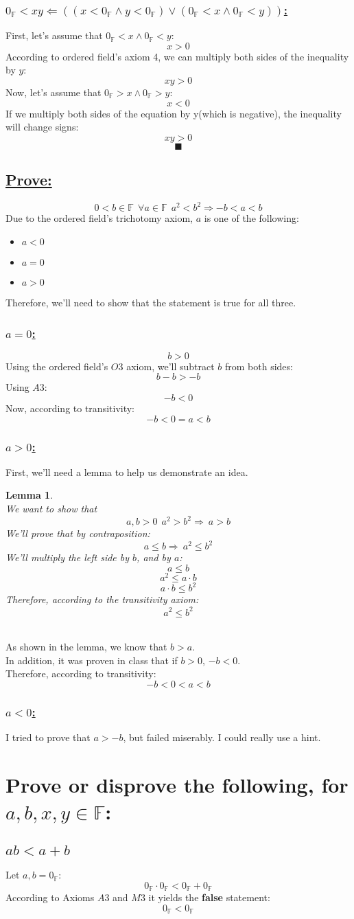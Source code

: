 \documentclass[a4paper, 12pt]{article}
\newcommand{\sub}[1]{\subsection{\underline{#1}}}
\newcommand{\subsub}[1]{\subsubsection{\underline{#1}}}
\newcommand{\?}{\stackrel{?}{=}}
\newcommand{\F}{\ensuremath{\mathbb{F}}}
\renewcommand{\qed}{$$\blacksquare$$}
\renewcommand{\b}[1]{\textbf{#1}}
\newtheorem{lemma}{Lemma}
\begin{document}
\subsub{$ 0_{\F}<xy \Longleftarrow ((x<0_{\F} \land y<0_{\F}) \lor (0_{\F} < x \land 0_{\F}<y))$:}
First, let's assume that $0_{\F} < x \land 0_{\F}<y$: $$x > 0 $$
According to ordered field's axiom 4, we can multiply both sides of the inequality by $y$: $$ xy > 0 $$
Now, let's assume that $0_{\F} > x \land 0_{\F}>y $: $$x < 0 $$
If we multiply both sides of the equation by y(which is negative), the inequality will change signs: $$ xy > 0 $$
\qed\pagebreak

\sub{Prove:}
$$ 0<b\in{\F}~~\forall{a}\in{\F}~~a^2<b^2 \Longrightarrow -b<a<b $$
Due to the ordered field's trichotomy axiom, $a$ is one of the following:
\begin{itemize}
    \item $a<0$
    \item $a=0$
    \item $a>0$
\end{itemize}
Therefore, we'll need to show that the statement is true for all three.

\subsub{$a=0$:}
$$ b>0 $$
Using the ordered field's $O3$ axiom, we'll subtract $b$ from both sides: $$ b-b > -b $$
Using $A3$: $$ -b < 0 $$
Now, according to transitivity: $$ -b < 0 = a < b $$

\subsub{$a>0$:}
First, we'll need a lemma to help us demonstrate an idea.
\begin{lemma}
    ~\\We want to show that $$ a,b>0 ~~ a^2 > b^2 \Longrightarrow~ a>b $$
    We'll prove that by contraposition: $$ a\leq{b} \Longrightarrow~ a^2\leq{b^2} $$
    We'll multiply the left side by $b$, and by $a$:
    $$ a\leq{b} $$
    $$ a^2\leq{a\cdot{b}} $$
    $$ a\cdot{b}\leq{b^2} $$
    Therefore, according to the transitivity axiom: $$ a^2 \leq{b^2} $$
\end{lemma}
\pagebreak
~\\As shown in the lemma, we know that $b>a$.\\
In addition, it was proven in class that if $b>0$, $-b<0$.\\
Therefore, according to transitivity:
$$ -b < 0 < a < b $$

\subsub{$a<0$:}
I tried to prove that $a>-b$, but failed miserably.
I could really use a hint.

\section{Prove or disprove the following, for $a,b,x,y \in{\F}$:}
\sub{$ab<a+b$}
Let $a,b=0_{\F}$: $$ 0_{\F}\cdot{0_{\F}} < 0_{\F} + 0_{\F} $$
According to Axioms $A3$ and $M3$ it yields the \b{false} statement: $$ 0_{\F} < 0_{\F} $$
\end{document}
